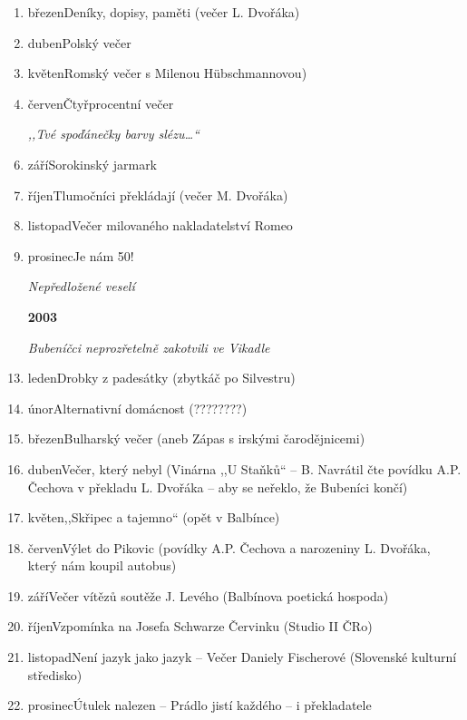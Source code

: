 \begin{enumerate}
 \item březen\quad Deníky, dopisy, paměti (večer L. Dvořáka)
 \item duben\quad Polský večer
 \item květen\quad Romský večer s Milenou Hübschmannovou)
 \item červen\quad Čtyřprocentní večer 
 \item[] \textit{,,Tvé spoďánečky barvy slézu\ldots``}
 \item září\quad Sorokinský jarmark
 \item říjen\quad Tlumočníci překládají (večer M. Dvořáka)
 \item listopad\quad Večer milovaného nakladatelství Romeo
 \item prosinec\quad Je nám 50! 
 \item[] \textit{Nepředložené veselí}
 \item[\textbf{2003}]
 \item[] \textit{Bubeníčci neprozřetelně zakotvili ve Vikadle}
 \item leden\quad Drobky z padesátky (zbytkáč po Silvestru)
 \item únor\quad Alternativní domácnost (????????)
 \item březen\quad Bulharský večer (aneb Zápas s irskými čarodějnicemi)
 \item duben\quad Večer, který nebyl (Vinárna ,,U Staňků`` -- B. Navrátil čte povídku A.P. Čechova v překladu L. Dvořáka -- aby se neřeklo, že Bubeníci končí)
 \item květen\quad ,,Skřipec a tajemno`` (opět v Balbínce)
 \item červen\quad Výlet do Pikovic (povídky A.P. Čechova a narozeniny L. Dvořáka, který nám koupil autobus)
 \item září\quad Večer vítězů soutěže J. Levého (Balbínova poetická hospoda)
 \item říjen\quad Vzpomínka na Josefa Schwarze Červinku (Studio II ČRo)
 \item listopad\quad Není jazyk jako jazyk -- Večer Daniely Fischerové (Slovenské kulturní středisko)
 \item prosinec\quad Útulek nalezen -- Prádlo jistí každého -- i překladatele


\end{enumerate}

